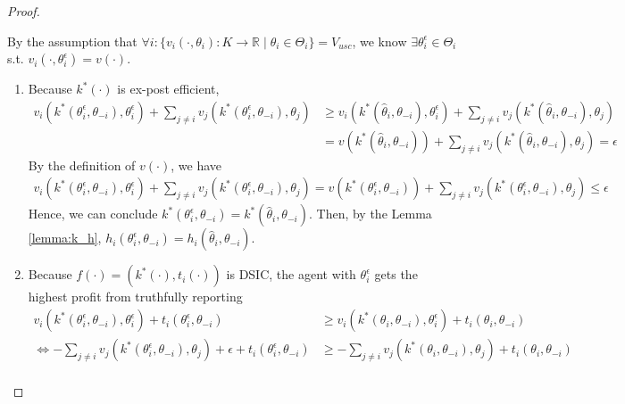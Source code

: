 \documentclass[11pt]{elegantbook_2}
\begin{document}
\begin{proof}
\begin{enumerate}
        By the assumption that $\forall i: \{v_i(\cdot,\theta_i): K \rightarrow \mathbb{R}\mid \theta_i\in\Theta_i\}=V_{usc}$, we know $\exists \theta^\epsilon_i\in\Theta_i$ s.t. $v_i(\cdot,\theta^\epsilon_i)=v(\cdot)$.
        \begin{enumerate}[$\circ$]
            \item Because $k^*(\cdot)$ is ex-post efficient,
            \begin{equation}
                \begin{aligned}
                    v_i(k^*(\theta^\epsilon_i,\theta_{-i}),\theta^\epsilon_i)+\sum_{j\neq i} v_j(k^*(\theta^\epsilon_i,\theta_{-i}),\theta_j)&\geq v_i(k^*(\hat{\theta}_i,\theta_{-i}),\theta^\epsilon_i)+\sum_{j\neq i} v_j(k^*(\hat{\theta}_i,\theta_{-i}),\theta_j)\\
                    &=v(k^*(\hat{\theta}_i,\theta_{-i}))+\sum_{j\neq i} v_j(k^*(\hat{\theta}_i,\theta_{-i}),\theta_j)=\epsilon
                \end{aligned}
                \nonumber
            \end{equation}
            By the definition of $v(\cdot)$, we have
            \begin{equation}
                \begin{aligned}
                    v_i(k^*(\theta^\epsilon_i,\theta_{-i}),\theta^\epsilon_i)+\sum_{j\neq i} v_j(k^*(\theta^\epsilon_i,\theta_{-i}),\theta_j)=v(k^*(\theta^\epsilon_i,\theta_{-i}))+\sum_{j\neq i} v_j(k^*(\theta^\epsilon_i,\theta_{-i}),\theta_j)\leq \epsilon
                \end{aligned}
                \nonumber
            \end{equation}
            Hence, we can conclude $k^*(\theta^\epsilon_i,\theta_{-i})=k^*(\hat{\theta}_i,\theta_{-i})$. Then, by the Lemma \ref{lemma:k_h}, $h_i(\theta^\epsilon_i,\theta_{-i})=h_i(\hat{\theta}_i,\theta_{-i})$.
            \item Because $f(\cdot)=\left(k^*(\cdot),t_i(\cdot)\right)$ is DSIC, the agent with $\theta^\epsilon_i$ gets the highest profit from truthfully reporting
            \begin{equation}
                \begin{aligned}
                    v_i(k^*(\theta^\epsilon_i,\theta_{-i}),\theta^\epsilon_i)+t_i(\theta^\epsilon_i,\theta_{-i})&\geq v_i(k^*(\theta_i,\theta_{-i}),\theta^\epsilon_i)+t_i(\theta_i,\theta_{-i})\\
                    \Leftrightarrow -\sum_{j\neq i}v_j(k^*(\theta^\epsilon_i,\theta_{-i}),\theta_j)+\epsilon+t_i(\theta^\epsilon_i,\theta_{-i})&\geq-\sum_{j\neq i}v_j(k^*(\theta_i,\theta_{-i}),\theta_j)+t_i(\theta_i,\theta_{-i})\\

\end{aligned}
\end{equation}
\end{enumerate}
\end{enumerate}
\end{proof}
\end{document}
